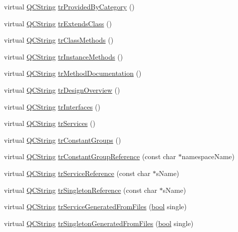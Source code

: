\begin{DoxyCompactItemize}
virtual \hyperlink{class_q_c_string}{Q\+C\+String} \hyperlink{class_translator_chinesetraditional_aa75037ae6678f4a7ed4602e3cdff7972}{tr\+Provided\+By\+Category} ()
\item 
virtual \hyperlink{class_q_c_string}{Q\+C\+String} \hyperlink{class_translator_chinesetraditional_a3b5605dd807ddb103e8cdeb8af243185}{tr\+Extends\+Class} ()
\item 
virtual \hyperlink{class_q_c_string}{Q\+C\+String} \hyperlink{class_translator_chinesetraditional_a361fda1ff6b981ffed6d10a2b4c7fccc}{tr\+Class\+Methods} ()
\item 
virtual \hyperlink{class_q_c_string}{Q\+C\+String} \hyperlink{class_translator_chinesetraditional_afab284f06e27847d9e7644a4fbe58d3a}{tr\+Instance\+Methods} ()
\item 
virtual \hyperlink{class_q_c_string}{Q\+C\+String} \hyperlink{class_translator_chinesetraditional_a9fd0d0249670ff6273e43449ef315c49}{tr\+Method\+Documentation} ()
\item 
virtual \hyperlink{class_q_c_string}{Q\+C\+String} \hyperlink{class_translator_chinesetraditional_a28a04fe5921fbe1690c31a043538b588}{tr\+Design\+Overview} ()
\item 
virtual \hyperlink{class_q_c_string}{Q\+C\+String} \hyperlink{class_translator_chinesetraditional_af2de8c3ebf596f3829145dac56a3931c}{tr\+Interfaces} ()
\item 
virtual \hyperlink{class_q_c_string}{Q\+C\+String} \hyperlink{class_translator_chinesetraditional_a0fed5291443bec412ebc9090507552a0}{tr\+Services} ()
\item 
virtual \hyperlink{class_q_c_string}{Q\+C\+String} \hyperlink{class_translator_chinesetraditional_a476250d59fc7c2599b65b052287b3505}{tr\+Constant\+Groups} ()
\item 
virtual \hyperlink{class_q_c_string}{Q\+C\+String} \hyperlink{class_translator_chinesetraditional_ad4481567c4ff9e4a01302ae6aa3a34e3}{tr\+Constant\+Group\+Reference} (const char $\ast$namespace\+Name)
\item 
virtual \hyperlink{class_q_c_string}{Q\+C\+String} \hyperlink{class_translator_chinesetraditional_ad3ce43e1363103ca2a4a6197810175f2}{tr\+Service\+Reference} (const char $\ast$s\+Name)
\item 
virtual \hyperlink{class_q_c_string}{Q\+C\+String} \hyperlink{class_translator_chinesetraditional_a1e77bfd70f909c07ca8228c1338290ea}{tr\+Singleton\+Reference} (const char $\ast$s\+Name)
\item 
virtual \hyperlink{class_q_c_string}{Q\+C\+String} \hyperlink{class_translator_chinesetraditional_af4888410c1f5838745ada14d1b2973ae}{tr\+Service\+Generated\+From\+Files} (\hyperlink{qglobal_8h_a1062901a7428fdd9c7f180f5e01ea056}{bool} single)
\item 
virtual \hyperlink{class_q_c_string}{Q\+C\+String} \hyperlink{class_translator_chinesetraditional_a79cb185cc0dee98a7809c286d54a7203}{tr\+Singleton\+Generated\+From\+Files} (\hyperlink{qglobal_8h_a1062901a7428fdd9c7f180f5e01ea056}{bool} single)
\end{DoxyCompactItemize}


